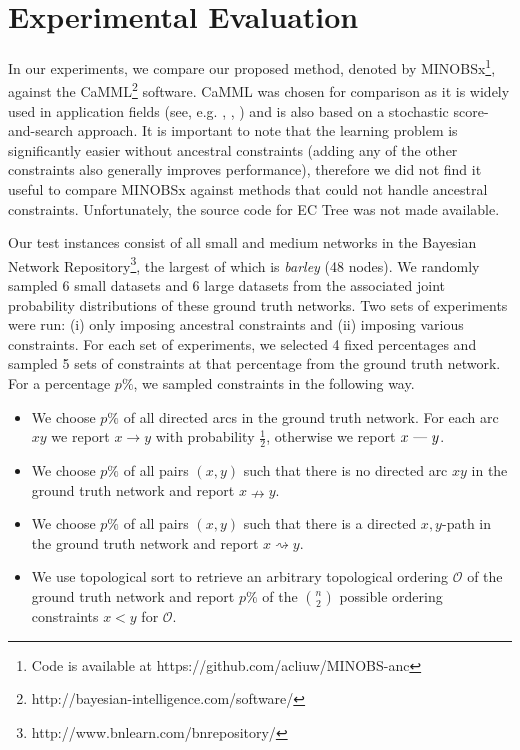 \documentclass[twoside,11pt]{article}
\begin{document}
\section{Experimental Evaluation}
\label{SECTION:Experimental}

In our experiments, we compare our proposed method, denoted by MINOBSx\footnote{Code is available at https://github.com/acliuw/MINOBS-anc},
against the CaMML\footnote{http://bayesian-intelligence.com/software/} software. CaMML was chosen for comparison as it is widely
used in application fields (see, e.g. \cite{Flores2011}, \cite{Kennett2001}, \cite{Sesen2013}) and is also based on a stochastic score-and-search approach. 
It is important to note that the learning problem is significantly easier without ancestral constraints (adding any of the other constraints also generally improves
performance), therefore we did not find it useful to compare MINOBSx against methods that could not handle ancestral constraints. 
Unfortunately, the source code for EC Tree was not made available.

\smallskip
Our test instances consist of all small and medium networks in the Bayesian Network Repository\footnote{http://www.bnlearn.com/bnrepository/}, the largest of 
which is \emph{barley} (48 nodes). We randomly sampled 6 small datasets and 6 large datasets from the associated joint
probability distributions of these ground truth networks. Two sets of experiments were run:
(i) only imposing ancestral constraints and (ii) imposing various constraints. For each set of experiments, we selected 4 fixed percentages and sampled 5 sets of constraints
at that percentage from the ground truth network. For a percentage $p\%$, we sampled constraints in the following way.

\begin{itemize}
\itemsep0em
\item We choose $p\%$ of all directed arcs in the ground truth network. For each arc $xy$ we report $x \rightarrow y$ with probability $\frac{1}{2}$, otherwise we report 
$x \text{ \textemdash \  } y$.

\item We choose $p\%$ of all pairs $(x, y)$ such that there is no directed arc $xy$ in the ground truth network and report $x \nrightarrow y$. 

\item We choose $p\%$ of all pairs $(x, y)$ such that there is a directed $x, y$-path in the ground truth network and report $x \rightsquigarrow y$.

\item We use topological sort to retrieve an arbitrary topological ordering $\mathcal{O}$ of the ground truth network and report $p\%$ of the $n \choose 2$ possible ordering constraints $x < y$ for
$\mathcal{O}$. 
\end{itemize}
\end{document}
